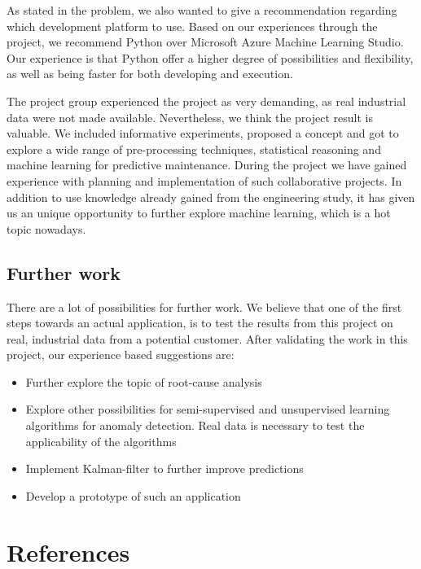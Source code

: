 \documentclass[english, a4paper]{report}
\begin{document}
{    \par
    As stated in the problem, we also wanted to give a recommendation regarding which development platform to use. Based on our experiences through the project, we recommend Python over Microsoft Azure Machine Learning Studio. Our experience is that Python offer a higher degree of possibilities and flexibility, as well as being faster for both developing and execution.
    \par
    The project group experienced the project as very demanding, as real industrial data were not made available. Nevertheless, we think the project result is valuable. We included informative experiments, proposed a concept and got to explore a wide range of pre-processing techniques, statistical reasoning and machine learning for predictive maintenance. During the project we have gained experience with planning and implementation of such collaborative projects. In addition to use knowledge already gained from the engineering study, it has given us an unique opportunity to further explore machine learning, which is a hot topic nowadays. 
    
    \section{Further work}
    {
        There are a lot of possibilities for further work. We believe that one of the first steps towards an actual application, is to test the results from this project on real, industrial data from a potential customer. After validating the work in this project, our experience based suggestions are:
        \begin{itemize}
            \item Further explore the topic of root-cause analysis
            \item Explore other possibilities for semi-supervised and unsupervised learning algorithms for anomaly detection. Real data is necessary to test the applicability of the algorithms
            \item Implement Kalman-filter to further improve predictions
            \item Develop a prototype of such an application
        \end{itemize}
    }
}

\newpage
\chapter{References}
{
    \printbibliography[heading=none]
}
\end{document}
